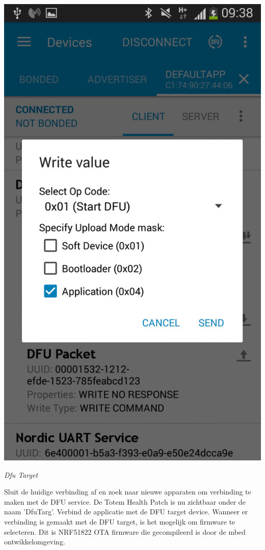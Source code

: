 \documentclass[conference]{IEEEtran}
\begin{document}
\begin{center}
    \includegraphics[scale=0.3]{FOTA3}
    \begin{minipage}{0.6\textwidth}
    \footnotesize
    \emph{Dfu Target}
    \end{minipage}
\end{center}
\newpage
Sluit de huidige verbinding af en zoek naar nieuwe apparaten om verbinding te maken met de DFU service. De Totem Health Patch is nu zichtbaar onder de naam 'DfuTarg'. Verbind de applicatie met de DFU target device. Wanneer er verbinding is gemaakt met de DFU target, is het mogelijk om firmware te selecteren. Dit is NRF51822 OTA firmware die gecompileerd is door de mbed ontwikkelomgeving.  
\end{document}
